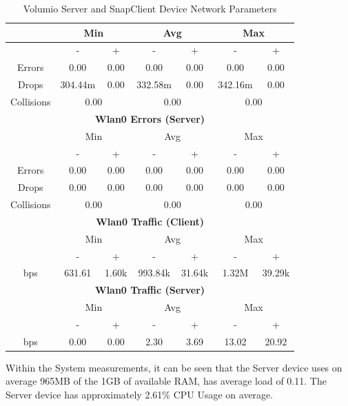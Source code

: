 \documentclass[11pt,a4paper,headinclude=false,footinclude=false]{scrreprt}
\begin{document}
\begin{table}[H]
\begin{tabular}{||c|c|c|c|c|c|c||}
    \hline\hline
      & \multicolumn{2}{|c|}{Min} & \multicolumn{2}{|c|}{Avg} & \multicolumn{2}{|c|}{Max} \\
    \hline
      & - & + & - & + & - & + \\
    \hline
    Errors  & 0.00 & 0.00 & 0.00 & 0.00 & 0.00 & 0.00 \\
    \hline
    Drops & 304.44m & 0.00 & 332.58m & 0.00 & 342.16m & 0.00 \\
    \hline
    Collisions & \multicolumn{2}{|c|}{0.00} & \multicolumn{2}{|c|}{0.00} & \multicolumn{2}{|c|}{0.00} \\
    \hline\hline
    \multicolumn{7}{|c|}{\textbf{Wlan0 Errors (Server)}} \\
    \hline\hline
      & \multicolumn{2}{|c|}{Min} & \multicolumn{2}{|c|}{Avg} & \multicolumn{2}{|c|}{Max} \\
    \hline
      & - & + & - & + & - & + \\
    \hline
    Errors  & 0.00 & 0.00 & 0.00 & 0.00 & 0.00 & 0.00 \\
    \hline
    Drops & 0.00 & 0.00 & 0.00 & 0.00 & 0.00 & 0.00 \\
    \hline
    Collisions & \multicolumn{2}{|c|}{0.00} & \multicolumn{2}{|c|}{0.00} & \multicolumn{2}{|c|}{0.00} \\
    \hline\hline
    \multicolumn{7}{|c|}{\textbf{Wlan0 Traffic (Client)}} \\
    \hline\hline
      & \multicolumn{2}{|c|}{Min} & \multicolumn{2}{|c|}{Avg} & \multicolumn{2}{|c|}{Max} \\
    \hline
      & - & + & - & + & - & + \\
    \hline
    bps  & 631.61 & 1.60k & 993.84k & 31.64k & 1.32M & 39.29k \\
    \hline\hline
    \multicolumn{7}{|c|}{\textbf{Wlan0 Traffic (Server)}} \\
    \hline\hline
      & \multicolumn{2}{|c|}{Min} & \multicolumn{2}{|c|}{Avg} & \multicolumn{2}{|c|}{Max} \\
    \hline
      & - & + & - & + & - & + \\
    \hline
    bps  & 0.00 & 0.00 & 2.30 & 3.69 & 13.02 & 20.92 \\
    \hline\hline
    \end{tabular}
    \caption{Volumio Server and SnapClient Device Network Parameters}
    \label{VolumioclientserverNetTab}
\end{table}

Within the System measurements, it can be seen that the Server device
uses on average 965MB of the 1GB of available RAM, has average load of
0.11. The Server device has approximately 2.61\% CPU Usage on average.
\end{document}

